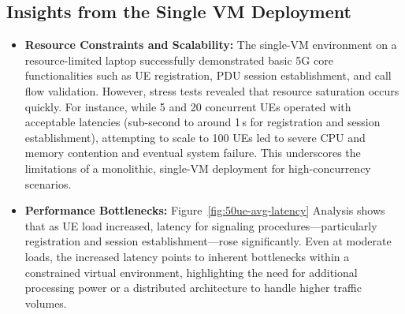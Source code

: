 \subsection{Insights from the Single VM Deployment}
\begin{itemize}
    \item \textbf{Resource Constraints and Scalability:}  
    The single-VM environment on a resource-limited laptop successfully demonstrated basic 5G core functionalities such as UE registration, PDU session establishment, and call flow validation. However, stress tests revealed that resource saturation occurs quickly. For instance, while 5 and 20 concurrent UEs operated with acceptable latencies (sub-second to around 1\,s for registration and session establishment), attempting to scale to 100 UEs led to severe CPU and memory contention and eventual system failure. This underscores the limitations of a monolithic, single-VM deployment for high-concurrency scenarios.
    
    \item \textbf{Performance Bottlenecks:}  
    {Figure~\ref{fig:50ue-avg-latency} Analysis} shows that as UE load increased, latency for signaling procedures—particularly registration and session establishment—rose significantly. Even at moderate loads, the increased latency points to inherent bottlenecks within a constrained virtual environment, highlighting the need for additional processing power or a distributed architecture to handle higher traffic volumes.
\end{itemize}

